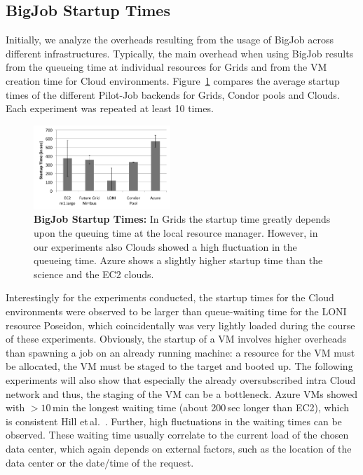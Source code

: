 \documentclass[conference,final]{IEEEtran}
\newcommand{\up}{\vspace*{-1em}}
\begin{document}
\subsection{BigJob Startup Times} 

Initially, we analyze the overheads resulting from the usage of BigJob across
different infrastructures. Typically, the main overhead when using
BigJob results from the queueing time at individual resources for
Grids and from the VM creation time for Cloud environments.
Figure~\ref{fig:performance_setup_time} compares the average startup times of
the different Pilot-Job backends for Grids, Condor pools and Clouds. Each 
experiment was repeated at least 10 times.

\begin{figure}[htbp]
    \centering
        \includegraphics[width=0.46\textwidth]{performance/setup-times}
    \caption{\textbf{BigJob Startup Times:} In Grids the startup time
      greatly depends upon the queuing time at the local resource
      manager. However, in our experiments also Clouds showed a high
      fluctuation in the queueing time. Azure shows a slightly higher
      startup time than the science and the EC2 clouds.\up}
    \label{fig:performance_setup_time}
\end{figure}

Interestingly for the experiments conducted, the startup times for the
Cloud environments were observed to be larger than queue-waiting time
for the LONI resource Poseidon, which coincidentally was very lightly
loaded during the course of these experiments. Obviously, the startup
of a VM involves higher overheads than spawning a job on an already
running machine: a resource for the VM must be allocated, the VM must
be staged to the target and booted up. The following experiments will
also show that especially the already oversubscribed intra Cloud
network and thus, the staging of the VM can be a bottleneck. Azure VMs
showed with $>10$\,min the longest waiting time (about 200\,sec longer than EC2), which
is consistent Hill et\,al.~\cite{hill10}.  Further,
high fluctuations in the waiting times can be observed. These waiting time
usually correlate to the current load of the chosen data center, which again
depends on external factors, such as the location of the data center or 
the date/time of the request.
\end{document}
